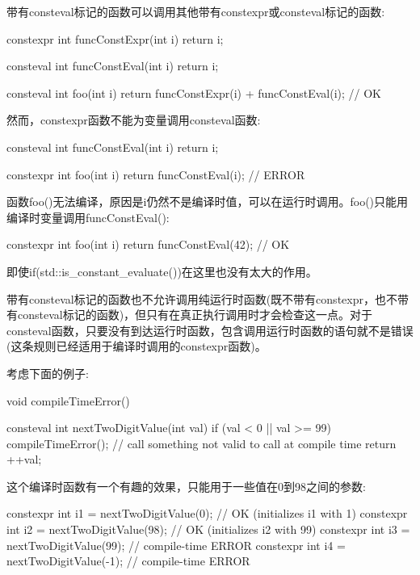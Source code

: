 
带有consteval标记的函数可以调用其他带有constexpr或consteval标记的函数:

\begin{cpp}
constexpr int funcConstExpr(int i) {
	return i;
}

consteval int funcConstEval(int i) {
	return i;
}

consteval int foo(int i) {
	return funcConstExpr(i) + funcConstEval(i); // OK
}
\end{cpp}

然而，constexpr函数不能为变量调用consteval函数:

\begin{cpp}
consteval int funcConstEval(int i) {
	return i;
}

constexpr int foo(int i) {
	return funcConstEval(i); // ERROR
}
\end{cpp}

函数foo()无法编译，原因是i仍然不是编译时值，可以在运行时调用。foo()只能用编译时变量调用funcConstEval():

\begin{cpp}
constexpr int foo(int i) {
	return funcConstEval(42); // OK
}
\end{cpp}

即使if(std::is\_constant\_evaluate())在这里也没有太大的作用。

带有consteval标记的函数也不允许调用纯运行时函数(既不带有constexpr，也不带有consteval标记的函数)，但只有在真正执行调用时才会检查这一点。对于consteval函数，只要没有到达运行时函数，包含调用运行时函数的语句就不是错误(这条规则已经适用于编译时调用的constexpr函数)。

考虑下面的例子:

\begin{cpp}
void compileTimeError()
{
}

consteval int nextTwoDigitValue(int val)
{
	if (val < 0 || val >= 99) {
		compileTimeError(); // call something not valid to call at compile time
	}
	return ++val;
}
\end{cpp}

这个编译时函数有一个有趣的效果，只能用于一些值在0到98之间的参数:

\begin{cpp}
constexpr int i1 = nextTwoDigitValue(0); // OK (initializes i1 with 1)
constexpr int i2 = nextTwoDigitValue(98); // OK (initializes i2 with 99)
constexpr int i3 = nextTwoDigitValue(99); // compile-time ERROR
constexpr int i4 = nextTwoDigitValue(-1); // compile-time ERROR
\end{cpp}

